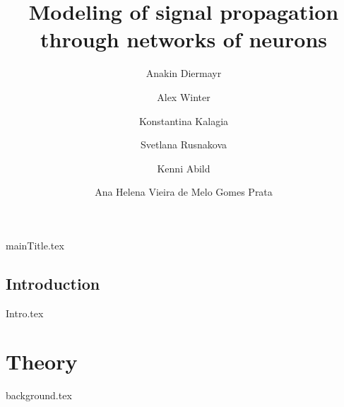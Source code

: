 \documentclass[printGloss, printBibble]{myRUCProject}
\title{Modeling of signal propagation through networks of neurons}
\author{ Anakin Diermayr \and  Alex Winter \and Konstantina Kalagia \and Svetlana Rusnakova \and Kenni Abild \and  Ana Helena Vieira de Melo Gomes Prata }
\begin{document}


{mainTitle.tex}


{%
\setlength{\parskip}{0.5ex} %
\tableofcontents%

\printacronyms%

\listoftodos
}










\newpage
{}
\chapter*{Introduction} 
{Intro.tex}

\part{Theory}

{background.tex}





\end{document}
